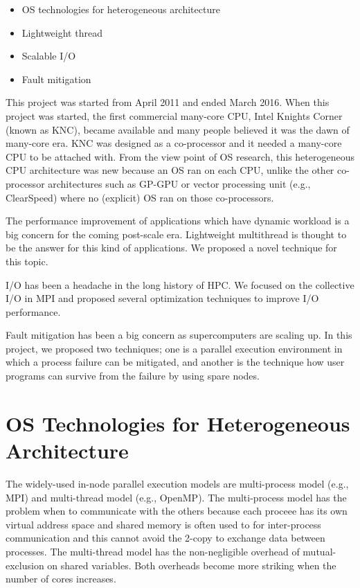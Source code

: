 \begin{itemize}
\item OS technologies for heterogeneous architecture
\item Lightweight thread
\item Scalable I/O
\item Fault mitigation
\end{itemize}

This project was started from April 2011 and ended March 2016. When
this project was started, the first commercial many-core CPU, Intel
Knights Corner (known as KNC)\cite{overview-xeon-phi}, became
available and many people 
believed it was the dawn of many-core era. KNC was designed as a
co-processor and it needed a many-core CPU to be attached with. From
the view point of OS research, this heterogeneous CPU architecture was
new because an OS ran on each CPU, unlike the other co-processor
architectures such as GP-GPU or vector processing unit (e.g.,
ClearSpeed) where no (explicit) OS ran on those co-processors. 

The performance improvement of applications which have dynamic
workload is a big concern for the coming post-scale era. Lightweight
multithread is thought to be the answer for this kind of
applications. We proposed a novel technique for this topic.

I/O has been a headache in the long history of HPC. We focused on the
collective I/O in MPI and proposed several optimization techniques to
improve I/O performance.

Fault mitigation has been a big concern as supercomputers are scaling
up. In this project, we proposed two techniques; one is a parallel
execution environment in which a process failure can be mitigated, and
another is the technique how user programs can survive from the
failure by using spare nodes.

\section{OS Technologies for Heterogeneous Architecture}

The widely-used in-node parallel execution models are
multi-process model (e.g., MPI) and multi-thread model (e.g.,
OpenMP). The multi-process model has the problem when to communicate
with the others because each proceee has its own virtual address space
and shared memory is often used to for inter-process
communication and this cannot avoid the 2-copy to exchange data
between processes. The multi-thread model has the non-negligible  
overhead of mutual-exclusion on shared variables. Both overheads
become more striking when the number of cores increases. 


